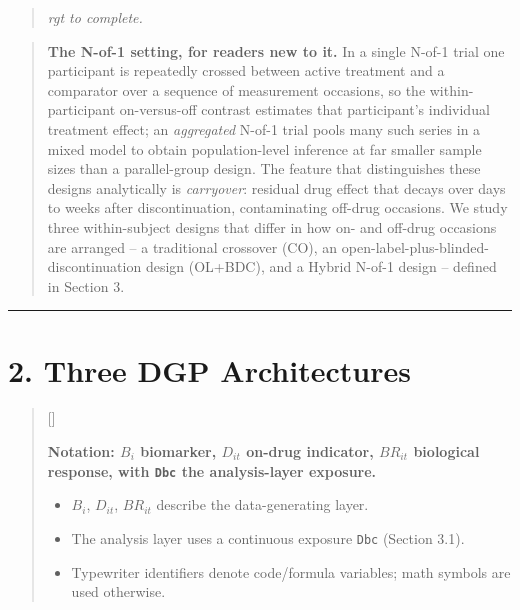 \documentclass[
  11pt,
]{article}
\newcounter{pgraph}
\newenvironment{bullets}{%
  \stepcounter{pgraph}%
  \begin{quote}\small\sffamily\color[gray]{0.30}%
  {\normalfont\scriptsize\color[gray]{0.58}[\thepgraph]\enspace}}{%
  \end{quote}}
\newenvironment{rgt}{%
  \begin{quote}\small\itshape\color[RGB]{20,60,160}}{%
  \end{quote}}
\newenvironment{orig}{%
  \begin{quote}\normalsize\color[gray]{0.55}}{%
  \end{quote}}
\begin{document}
\begin{rgt}
rgt to complete.

\end{rgt}

\begin{orig}
\textbf{The N-of-1 setting, for readers new to it.} In a single N-of-1
trial one participant is repeatedly crossed between active treatment and
a comparator over a sequence of measurement occasions, so the
within-participant on-versus-off contrast estimates that participant's
individual treatment effect; an \emph{aggregated} N-of-1 trial pools
many such series in a mixed model to obtain population-level inference
at far smaller sample sizes than a parallel-group design. The feature
that distinguishes these designs analytically is \emph{carryover}:
residual drug effect that decays over days to weeks after
discontinuation, contaminating off-drug occasions. We study three
within-subject designs that differ in how on- and off-drug occasions are
arranged -- a traditional crossover (CO), an open-label-plus-blinded-
discontinuation design (OL+BDC), and a Hybrid N-of-1 design -- defined
in Section 3.

\end{orig}

\bigskip\noindent

\rule{\textwidth}{0.4pt}\bigskip

\section{2. Three DGP Architectures}

\begin{bullets}

\textbf{Notation: $B_i$ biomarker, $D_{it}$ on-drug indicator,
$BR_{it}$ biological response, with \texttt{Dbc} the analysis-layer
exposure.}

\begin{itemize}\setlength{\itemsep}{2pt}\setlength{\parskip}{0pt}
\item $B_i$, $D_{it}$, $BR_{it}$ describe the data-generating layer.
\item The analysis layer uses a continuous exposure \texttt{Dbc}
(Section 3.1).
\item Typewriter identifiers denote code/formula variables;
math symbols are used otherwise.
\end{itemize}

\end{bullets}
\end{document}
